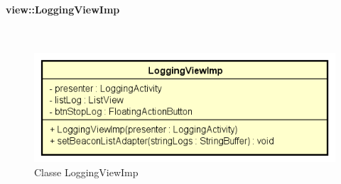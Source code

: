 \documentclass[../DefinizioneDiProdotto.tex]{subfiles}
\begin{document}
\paragraph{view::LoggingViewImp}
\
\begin{figure}[H]
	\centering
	\includegraphics[width=\maxwidth]{img/LoggingViewImp.png}
	\caption{Classe LoggingViewImp}\label{fig:view::LoggingViewImp} 
\end{figure}
\end{document}
